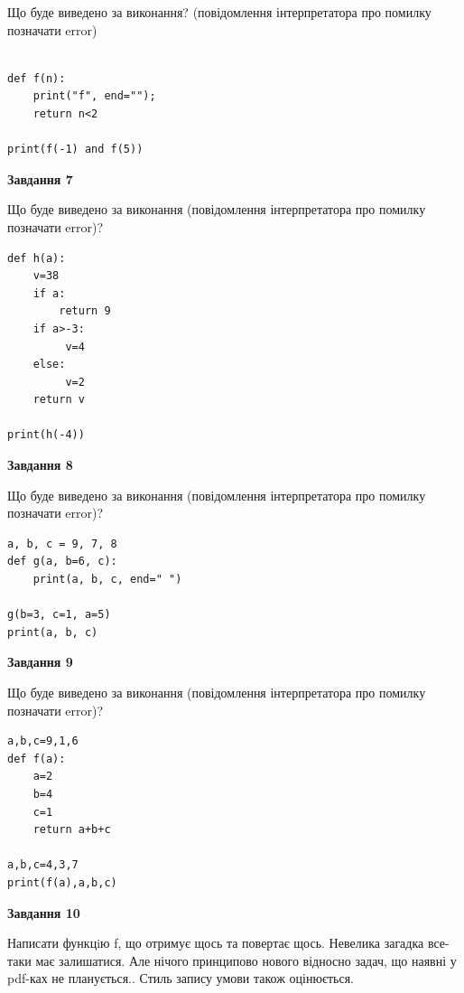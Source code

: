 \documentclass[12pt, ukrainian]{article}
\begin{document}
{\begin {large}
Що буде виведено за виконання? (повідомлення інтерпретатора про помилку позначати error)\par
\begin{verbatim}

def f(n):
    print("f", end="");
    return n<2

print(f(-1) and f(5))
\end{verbatim}

{\begin {center}\textbf{Завдання 7}\end {center}}

Що буде виведено за виконання (повідомлення інтерпретатора про помилку позначати error)?\par
\begin{verbatim}
def h(a):
    v=38
    if a: 
        return 9
    if a>-3:
         v=4
    else:
         v=2
    return v

print(h(-4))
\end{verbatim}

{\begin {center}\textbf{Завдання 8}\end {center}}

Що буде виведено за виконання (повідомлення інтерпретатора про помилку позначати error)?\par
\begin{verbatim}
a, b, c = 9, 7, 8
def g(a, b=6, c):
    print(a, b, c, end=" ")

g(b=3, c=1, a=5)
print(a, b, c)
\end{verbatim}

{\begin {center}\textbf{Завдання 9}\end {center}}

Що буде виведено за виконання (повідомлення інтерпретатора про помилку позначати error)?\par
\begin{verbatim}
a,b,c=9,1,6
def f(a):
    a=2
    b=4
    c=1
    return a+b+c

a,b,c=4,3,7
print(f(a),a,b,c)
\end{verbatim}

{\begin {center}\textbf{Завдання 10}\end {center}}


Написати функцiю f, що отримує щось та повертає щось. Невелика загадка все-таки має залишатися. Але нічого принципово нового відносно задач, що наявні у pdf-ках не планується.. Стиль запису умови також оцінюється.\par
\end {large}}
\newpage
\end{document}
